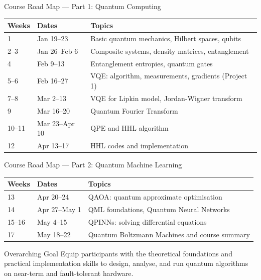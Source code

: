 \documentclass[aspectratio=169,12pt]{beamer}
\begin{document}
\begin{frame}{Course Road Map --- Part 1: Quantum Computing}
  \begin{center}
  \small
  \renewcommand{\arraystretch}{1.28}
  \begin{tabular}{@{}llp{8.0cm}@{}}
    \toprule
    \textbf{Weeks} & \textbf{Dates} & \textbf{Topics} \\
    \midrule
    1     & Jan 19--23     & Basic quantum mechanics, Hilbert spaces, qubits \\
    2--3  & Jan 26--Feb 6  & Composite systems, density matrices, entanglement \\
    4     & Feb 9--13      & Entanglement entropies, quantum gates \\
    5--6  & Feb 16--27     & VQE: algorithm, measurements, gradients (Project 1) \\
    7--8  & Mar 2--13      & VQE for Lipkin model, Jordan-Wigner transform \\
    9     & Mar 16--20     & Quantum Fourier Transform \\
    10--11& Mar 23--Apr 10 & QPE and HHL algorithm \\
    12    & Apr 13--17     & HHL codes and implementation \\
    \bottomrule
  \end{tabular}
  \end{center}
\end{frame}

\begin{frame}{Course Road Map --- Part 2: Quantum Machine Learning}
  \begin{center}
  \small
  \renewcommand{\arraystretch}{1.28}
  \begin{tabular}{@{}llp{8.0cm}@{}}
    \toprule
    \textbf{Weeks} & \textbf{Dates} & \textbf{Topics} \\
    \midrule
    13    & Apr 20--24     & QAOA: quantum approximate optimisation \\
    14    & Apr 27--May 1  & QML foundations, Quantum Neural Networks \\
    15--16& May 4--15      & QPINNs: solving differential equations \\
    17    & May 18--22     & Quantum Boltzmann Machines and course summary \\
    \bottomrule
  \end{tabular}
  \end{center}
  \vspace{6pt}
  \begin{alertblock}{Overarching Goal}
    Equip participants with the theoretical foundations and practical
    implementation skills to design, analyse, and run quantum algorithms
    on near-term and fault-tolerant hardware.
  \end{alertblock}
\end{frame}
\end{document}
